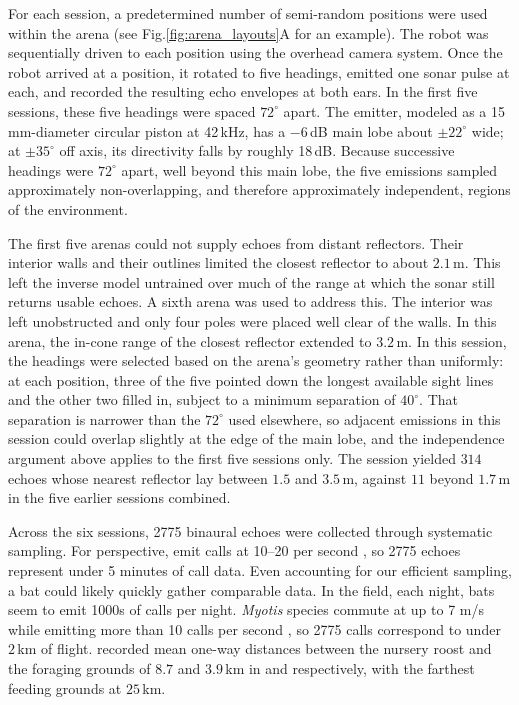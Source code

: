 \documentclass[11pt]{article}
\begin{document}
For each session, a predetermined number of semi-random positions were used within the arena (see Fig.\ref{fig:arena_layouts}A for an example). The robot was sequentially driven to each position using the overhead camera system. Once the robot arrived at a position, it rotated to five headings, emitted one sonar pulse at each, and recorded the resulting echo envelopes at both ears. In the first five sessions, these five headings were spaced $72^{\circ}$ apart. The emitter, modeled as a 15\,mm-diameter circular piston at 42\,kHz, has a $-6$\,dB main lobe about $\pm 22^{\circ}$ wide; at $\pm 35^{\circ}$ off axis, its directivity falls by roughly 18\,dB. Because successive headings were $72^{\circ}$ apart, well beyond this main lobe, the five emissions sampled approximately non-overlapping, and therefore approximately independent, regions of the environment.

The first five arenas could not supply echoes from distant reflectors. Their interior walls and their outlines limited the closest reflector to about $2.1$\,m. This left the inverse model untrained over much of the range at which the sonar still returns usable echoes. A sixth arena was used to address this. The interior was left unobstructed and only four poles were placed well clear of the walls. In this arena, the in-cone range of the closest reflector extended to $3.2$\,m. In this session, the headings were selected based on the arena's geometry rather than uniformly: at each position, three of the five pointed down the longest available sight lines and the other two filled in, subject to a minimum separation of $40^{\circ}$. That separation is narrower than the $72^{\circ}$ used elsewhere, so adjacent emissions in this session could overlap slightly at the edge of the main lobe, and the independence argument above applies to the first five sessions only. The session yielded $314$ echoes whose nearest reflector lay between $1.5$ and $3.5$\,m, against $11$ beyond $1.7$\,m in the five earlier sessions combined.

Across the six sessions, 2775 binaural echoes were collected through systematic sampling. For perspective,  emit calls at 10--20 per second \citep{Barchi2013}, so 2775 echoes represent under 5 minutes of call data. Even accounting for our efficient sampling, a bat could likely quickly gather comparable data. In the field, each night, bats seem to emit 1000s of calls per night. \textit{Myotis} species commute at up to 7 m/s while emitting more than 10 calls per second \citep{Holderied2006,Schaub2007}, so 2775 calls correspond to under $2$\,km of flight. \citet{Arlettaz1999a} recorded mean one-way distances between the nursery roost and the foraging grounds of $8.7$ and $3.9$\,km in  and  respectively, with the farthest feeding grounds at $25$\,km.
\end{document}
